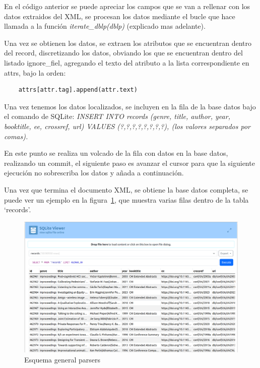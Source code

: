 \documentclass[a4paper, 12pt]{book}
\begin{document}
En el código anterior se puede apreciar los campos que se van a rellenar con los datos extraidos del XML, se procesan los datos mediante el bucle que hace llamada a la función \textit{iterate\_dblp(dblp)} (explicado mas adelante). 

Una vez se obtienen los datos, se extraen los atributos que se encuentran dentro del record, discretizando los datos, obviando los que se encuentran dentro del listado ignore\_fiel, agregando el texto del atributo a la lista correspondiente en attrs, bajo la orden:

\begin{verbatim}
    attrs[attr.tag].append(attr.text)
\end{verbatim}

Una vez tenemos los datos localizados, se incluyen en la fila de la base datos bajo el comando de SQLite:\textit{ INSERT INTO records (genre, title, author, year, booktitle, ee, crossref, url) VALUES (?,?,?,?,?,?,?,?), (los valores separados por comas).}

En este punto se realiza un volcado de la fila con datos en la base datos, realizando un commit, el siguiente paso es avanzar el cursor para que la siguiente ejecución no sobrescriba los datos y añada a continuación.

Una vez que termina el documento XML, se obtiene la base datos completa, se puede ver un ejemplo en la figura~\ref{fig:ej_bd}, que muestra varias filas dentro de la tabla `records'.

\begin{figure}[h]
  \centering
  \includegraphics[width=15cm, keepaspectratio]{img/ej_bd.png}
  \caption{Esquema general parsers}
  \label{fig:ej_bd}
\end{figure}
\end{document}
